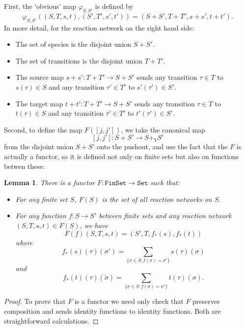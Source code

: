 \documentclass{compositionalityarticle}
\newcommand{\FinSet}{\mathtt{FinSet}}
\newcommand{\Set}{\mathtt{Set}}
\newcommand{\maps}{\colon}
\newcommand{\beq}{\begin{equation}}
\newcommand{\eeq}{\end{equation}}
\theoremstyle{plain}
\newtheorem{lem}[thm]{Lemma}
\theoremstyle{remark}
\begin{document}
First, the `obvious' map $\varphi_{S,S'}$ is defined by
\beq
\label{eq:Phi}
    \varphi_{S,S'} ((S,T,s,t), (S',T',s',t')) = (S + S', T + T', s+s', t+t').  
\eeq
In more detail, for the reaction network on the right hand side:
\begin{itemize}
\item The set of species is the disjoint union $S + S'$.
\item The set of transitions is the disjoint union $T + T'$.
\item The source map $s + s' \maps T + T' \to S + S'$ sends any transition $\tau \in T$ 
to $s(\tau) \in S$ and any transition $\tau' \in T'$ to $s'(\tau') \in S'$.  
\item The target map $t + t' \maps T + T' \to S + S'$ sends any transition $\tau \in T$ 
to $t(\tau) \in S$ and any transition $\tau' \in T'$ to $t'(\tau') \in S'$.  
\end{itemize}

Second, to define the map $F([j,j'])$, we take the canonical map
\[  [j,j'] \maps S+S' \to S+_Y S' \] 
from the disjoint union $S+S'$ onto the pushout, and use the fact that the
$F$ is actually a functor, so it is defined not only on finite sets but also on functions
betwen these:

\begin{lem}
\label{lemma:RFunctor}
There is a functor $F \maps \FinSet \to \Set$ such that:
\begin{itemize}
\item For any finite set $S$, $F(S)$ is the set of all reaction networks on $S$.
\item For any function $f \maps S \to S'$ between finite sets and any reaction network $(S,T,s,t) \in F(S)$, we have
\[    F(f)(S,T,s,t) = (S',T, f_*(s), f_*(t)) \]
where 
\beq  
f_*(s)(\tau)(\sigma') =\sum_{\{\sigma \in S : f(\sigma) = \sigma' \}} s(\tau)(\sigma)  
\label{stilde}
\eeq
and 
\beq  
f_*(t)(\tau)(\tilde{\sigma}) =\sum_{\{\sigma \in S : f(\sigma) = \sigma' \}} t(\tau)(\sigma) .
\label{ttilde}
\eeq
\end{itemize}
\end{lem}
\begin{proof}
To prove that $F$ is a functor we need only check that $F$ preserves composition
and sends identity functions to identity functions. Both are straightforward calculations.
\end{proof}
\end{document}
